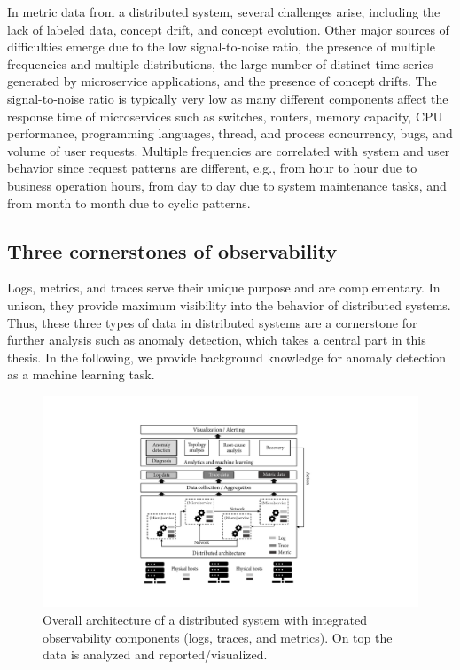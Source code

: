 In metric data from a distributed system, several challenges arise, including the lack of labeled data, concept drift, and concept evolution. Other major sources of difficulties emerge due to the low signal-to-noise ratio, the presence of multiple frequencies and multiple distributions, the large number of distinct time series generated by microservice applications, and the presence of concept drifts. The signal-to-noise ratio is typically very low as many different components affect the response time of microservices such as switches, routers, memory capacity, CPU performance, programming languages, thread, and process concurrency, bugs, and volume of user requests. Multiple frequencies are correlated with system and user behavior since request patterns are different, e.g., from hour to hour due to business operation hours, from day to day due to system maintenance tasks, and from month to month due to cyclic patterns.


\subsection{Three cornerstones of observability}
Logs, metrics, and traces serve their unique purpose and are complementary. In unison, they provide maximum visibility into the behavior of distributed systems. Thus, these three types of data in distributed systems are a cornerstone for further analysis such as anomaly detection, which takes a central part in this thesis. In the following, we provide background knowledge for anomaly detection as a machine learning task.

\begin{figure}[!b]
\centerline{\includegraphics[scale=0.8]{gfx/chap2/aiopsplatform.pdf}}
\caption{Overall architecture of a distributed system with integrated observability components (logs, traces, and metrics). On top the data is analyzed and reported/visualized.}
\label{fig:aiopsplatform}
\end{figure}

